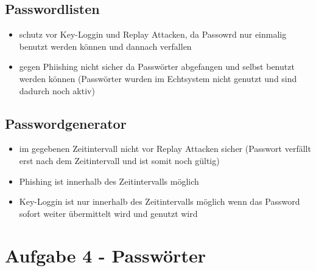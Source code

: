 \documentclass{scrartcl}
\begin{document}
\subsection*{Passwordlisten}
\begin{itemize}
  \item schutz vor Key-Loggin und Replay Attacken, da Passowrd nur einmalig
    benutzt werden können und dannach verfallen
  \item gegen Phiishing nicht sicher da Passwörter abgefangen und selbst
    benutzt werden können (Passwörter wurden im Echtsystem nicht genutzt und
    sind dadurch noch aktiv)
\end{itemize}

\subsection*{Passwordgenerator}
\begin{itemize}
  \item im gegebenen Zeitintervall nicht vor Replay Attacken sicher (Passwort
    verfällt erst nach dem Zeitintervall und ist somit noch gültig)
  \item Phishing ist innerhalb des Zeitintervalls möglich
  \item Key-Loggin ist nur innerhalb des Zeitintervalls möglich wenn das
    Password sofort weiter übermittelt wird und genutzt wird
\end{itemize}

\section*{Aufgabe 4 - Passwörter}
\end{document}
